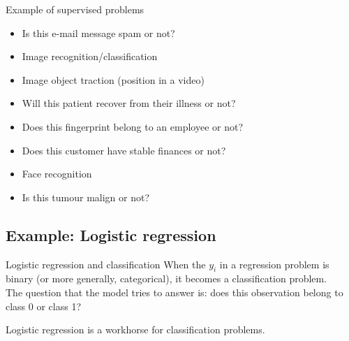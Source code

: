 \documentclass[10pt]{beamer}
\begin{document}
\begin{frame}{Example of supervised problems}



\pause

\begin{itemize}
\item Is this e-mail message spam or not?\pause
\item Image recognition/classification\pause
\item Image object traction (position in a video)\pause
\item Will this patient recover from their illness or not?\pause
\item Does this fingerprint belong to an employee or not?\pause
\item Does this customer have stable finances or not?\pause
\item Face recognition\pause
\item Is this tumour malign or not?\pause
\end{itemize}

\end{frame}

\subsection{Example: Logistic regression}

\begin{frame}{Logistic regression and classification}
When the $y_i$ in a regression problem is binary (or more generally, categorical), it becomes a {\color{uured}classification problem}.\\[3mm]\pause
The question that the model tries to answer is: does this observation belong to class 0 or class 1?\\[3mm]\pause

Logistic regression is a workhorse for classification problems.

\end{frame}
\end{document}
